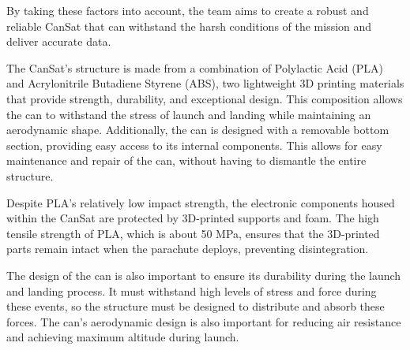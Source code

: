 \documentclass[11pt]{article}
\begin{document}
By taking these factors into account, the team aims to create a robust and reliable CanSat that can withstand the harsh conditions of the mission and deliver accurate data.

The CanSat's structure is made from a combination of Polylactic Acid (PLA) and Acrylonitrile Butadiene Styrene (ABS), two lightweight 3D printing materials that provide strength, durability, and exceptional design. This composition allows the can to withstand the stress of launch and landing while maintaining an aerodynamic shape. Additionally, the can is designed with a removable bottom section, providing easy access to its internal components. This allows for easy maintenance and repair of the can, without having to dismantle the entire structure.

Despite PLA's relatively low impact strength, the electronic components housed within the CanSat are protected by 3D-printed supports and foam. The high tensile strength of PLA, which is about 50 MPa, ensures that the 3D-printed parts remain intact when the parachute deploys, preventing disintegration.

The design of the can is also important to ensure its durability during the launch and landing process. It must withstand high levels of stress and force during these events, so the structure must be designed to distribute and absorb these forces. The can's aerodynamic design is also important for reducing air resistance and achieving maximum altitude during launch.
\end{document}
